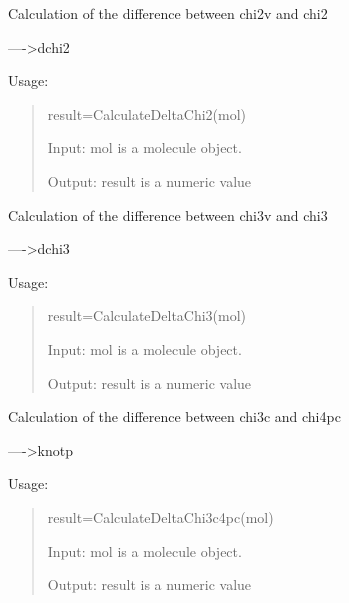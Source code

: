 \documentclass[letterpaper,10pt,english]{sphinxmanual}
\begin{document}

\begin{fulllineitems}
\label{reference/connectivity:connectivity.CalculateDeltaChi2}
Calculation of the difference between chi2v and chi2

----\textgreater{}dchi2

Usage:
\begin{quote}

result=CalculateDeltaChi2(mol)

Input: mol is a molecule object.

Output: result is a numeric value
\end{quote}

\end{fulllineitems}


\begin{fulllineitems}
\label{reference/connectivity:connectivity.CalculateDeltaChi3}
Calculation of the difference between chi3v and chi3

----\textgreater{}dchi3

Usage:
\begin{quote}

result=CalculateDeltaChi3(mol)

Input: mol is a molecule object.

Output: result is a numeric value
\end{quote}

\end{fulllineitems}


\begin{fulllineitems}
\label{reference/connectivity:connectivity.CalculateDeltaChi3c4pc}
Calculation of the difference between chi3c and chi4pc

----\textgreater{}knotp

Usage:
\begin{quote}

result=CalculateDeltaChi3c4pc(mol)

Input: mol is a molecule object.

Output: result is a numeric value
\end{quote}

\end{fulllineitems}
\end{document}
